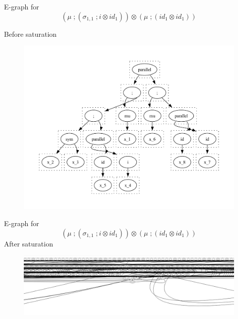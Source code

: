 \documentclass[aspectratio=169]{beamer}
\begin{document}
\begin{frame}
    \small
    \begin{example}
        \vspace{1em}
        E-graph for
        \[
            (\mu\;;(\sigma_{1,1}\;;i \otimes id_{1})) \otimes (\mu\;;(id_{1}\otimes id_{1}))
        \]

        Before saturation
        \vspace{-3em}
        \begin{figure}
            \includegraphics[scale=0.4]{figures/egraph_before_saturation.pdf}
        \end{figure}
    \end{example}
\end{frame}

\begin{frame}
    \small
    \begin{example}
        \vspace{1em}
        E-graph for
        \[
            (\mu\;;(\sigma_{1,1}\;;i \otimes id_{1})) \otimes (\mu\;;(id_{1}\otimes id_{1}))
        \]
        After saturation
        \begin{figure}
            \includegraphics[width=0.9\linewidth]{figures/dot_5.jpeg}
        \end{figure}
        
        \end{example}
\end{frame}
\end{document}
